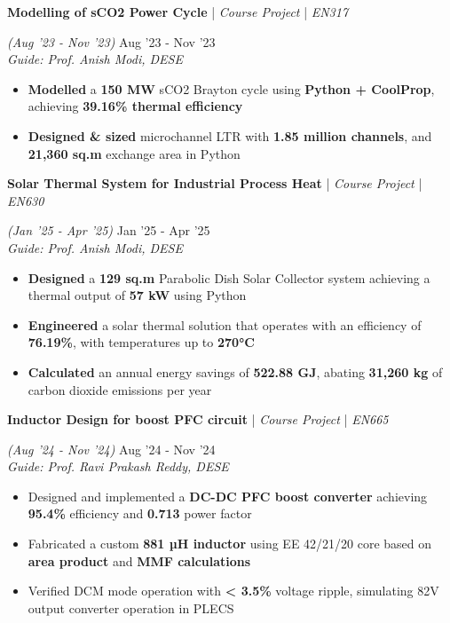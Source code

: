 \documentclass[10pt]{article}
\renewcommand{\subsection}[5]{
	\def\temp{#4}
	\vspace{2pt}
	{
		\large
		{\textbf{#1}} | {\sl #2} | {\sl #3} \filldate{#4}
		\ifx\temp\empty
		\else
		{
			\\[0.1em]
			\fontsize{11}{13.2}\selectfont
			\sl #5
		}
		\fi
	}
}
\newcommand{\filldate}[1]{\strut\hfill {\small \textit{(#1)}}}
\begin{document}
\subsection{Modelling of sCO2 Power Cycle}{Course Project}{EN317}{Aug '23 - Nov '23}{Guide: Prof. Anish Modi, DESE}
\begin{itemize}
	\item \textbf{Modelled} a \textbf{150 MW} sCO2 Brayton cycle using \textbf{Python + CoolProp}, achieving \textbf{39.16\% thermal efficiency}
	\item \textbf{Designed \& sized} microchannel LTR with \textbf{1.85 million channels}, and \textbf{21,360 sq.m} exchange area in Python
\end{itemize}

\subsection{Solar Thermal System for Industrial Process Heat}{Course Project}{EN630}{Jan '25 - Apr '25}{Guide: Prof. Anish Modi, DESE}
\begin{itemize}
	\item \textbf{Designed} a \textbf{129 sq.m} Parabolic Dish Solar Collector system achieving a thermal output of \textbf{57 kW} using Python
	\item \textbf{Engineered} a solar thermal solution that operates with an efficiency of \textbf{76.19\%}, with temperatures up to \textbf{270°C}
	\item \textbf{Calculated} an annual energy savings of \textbf{522.88 GJ}, abating \textbf{31,260 kg} of carbon dioxide emissions per year
\end{itemize}

\subsection{Inductor Design for boost PFC circuit}{Course Project}{EN665}{Aug '24 - Nov '24}{Guide: Prof. Ravi Prakash Reddy, DESE}
\begin{itemize}
	\item Designed and implemented a \textbf{DC-DC PFC boost converter} achieving \textbf{95.4\%} efficiency and \textbf{0.713} power factor
	\item Fabricated a custom \textbf{881 µH inductor} using EE 42/21/20 core based on \textbf{area product} and \textbf{MMF calculations} 
	\item Verified DCM mode operation with \textbf{< 3.5\%} voltage ripple, simulating 82V output converter operation in PLECS
\end{itemize}
\end{document}
